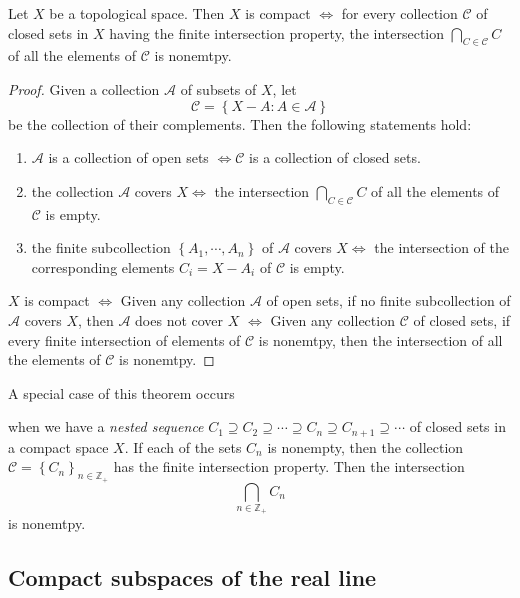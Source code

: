\begin{theorem}
  Let \( X \) be a topological space.
  Then \( X \) is compact \( \iff \) for every collection \( \mathcal{C} \) of closed sets in \( X \) having the finite intersection property, the intersection \( \bigcap_{C \in \mathcal{C}} C \) of all the elements of \( \mathcal{C} \) is nonemtpy.
\end{theorem}
\begin{proof}
  Given a collection \( \mathcal{A} \) of subsets of \( X \), let
  \[
    \mathcal{C} = \left\lbrace X - A: A \in \mathcal{A} \right\rbrace
  \]
  be the collection of their complements.
  Then the following statements hold:
  \begin{enumerate}
    \item \( \mathcal{A} \) is a collection of open sets \( \iff \mathcal{C} \) is a collection of closed sets.
    \item the collection \( \mathcal{A} \) covers \( X \iff \) the intersection \( \bigcap_{C \in \mathcal{C}} C \) of all the elements of \( \mathcal{C} \) is empty.
    \item the finite subcollection \( \left\lbrace A_1, \cdots, A_n \right\rbrace \) of \( \mathcal{A} \) covers \( X \iff \) the intersection of the corresponding elements \( C_i = X - A_i \) of \( \mathcal{C} \) is empty.
  \end{enumerate}
  \( X \) is compact \( \iff \) Given any collection \( \mathcal{A} \) of open sets, if no finite subcollection of \( \mathcal{A} \) covers \( X \), then \( \mathcal{A} \) does not cover \( X \) \( \iff \) Given any collection \( \mathcal{C} \) of closed sets, if every finite intersection of elements of \( \mathcal{C} \) is nonemtpy, then the intersection of all the elements of \( \mathcal{C} \) is nonemtpy.
\end{proof}
\noindent A special case of this theorem occurs
\begin{proposition}
   when we have a \emph{nested sequence} \( C_1 \supseteq C_2 \supseteq \cdots \supseteq C_n \supseteq C_{n + 1} \supseteq \cdots \) of closed sets in a compact space \( X \).
   If each of the sets \( C_n \) is nonempty, then the collection \( \mathcal{C} = \left\lbrace C_n \right\rbrace_{n \in \mathbb{Z}_+} \) has the finite intersection property.
   Then the intersection
   \[
     \bigcap_{n \in \mathbb{Z}_+} C_n
   \]
   is nonemtpy.
\end{proposition}

\subsection{Compact subspaces of the real line}

